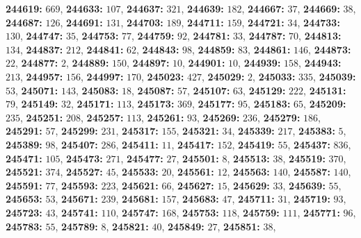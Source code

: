 \textsf{\bfseries 244619:} $669$, \textsf{\bfseries 244633:} $107$, \textsf{\bfseries 244637:} $321$, \textsf{\bfseries 244639:} $182$, \textsf{\bfseries 244667:} $37$, \textsf{\bfseries 244669:} $38$, \textsf{\bfseries 244687:} $126$, \textsf{\bfseries 244691:} $131$, \textsf{\bfseries 244703:} $189$, \textsf{\bfseries 244711:} $159$, \textsf{\bfseries 244721:} $34$, \textsf{\bfseries 244733:} $130$, \textsf{\bfseries 244747:} $35$, \textsf{\bfseries 244753:} $77$, \textsf{\bfseries 244759:} $92$, \textsf{\bfseries 244781:} $33$, \textsf{\bfseries 244787:} $70$, \textsf{\bfseries 244813:} $134$, \textsf{\bfseries 244837:} $212$, \textsf{\bfseries 244841:} $62$, \textsf{\bfseries 244843:} $98$, \textsf{\bfseries 244859:} $83$, \textsf{\bfseries 244861:} $146$, \textsf{\bfseries 244873:} $22$, \textsf{\bfseries 244877:} $2$, \textsf{\bfseries 244889:} $150$, \textsf{\bfseries 244897:} $10$, \textsf{\bfseries 244901:} $10$, \textsf{\bfseries 244939:} $158$, \textsf{\bfseries 244943:} $213$, \textsf{\bfseries 244957:} $156$, \textsf{\bfseries 244997:} $170$, \textsf{\bfseries 245023:} $427$, \textsf{\bfseries 245029:} $2$, \textsf{\bfseries 245033:} $335$, \textsf{\bfseries 245039:} $53$, \textsf{\bfseries 245071:} $143$, \textsf{\bfseries 245083:} $18$, \textsf{\bfseries 245087:} $57$, \textsf{\bfseries 245107:} $63$, \textsf{\bfseries 245129:} $222$, \textsf{\bfseries 245131:} $79$, \textsf{\bfseries 245149:} $32$, \textsf{\bfseries 245171:} $113$, \textsf{\bfseries 245173:} $369$, \textsf{\bfseries 245177:} $95$, \textsf{\bfseries 245183:} $65$, \textsf{\bfseries 245209:} $235$, \textsf{\bfseries 245251:} $208$, \textsf{\bfseries 245257:} $113$, \textsf{\bfseries 245261:} $93$, \textsf{\bfseries 245269:} $236$, \textsf{\bfseries 245279:} $186$, \textsf{\bfseries 245291:} $57$, \textsf{\bfseries 245299:} $231$, \textsf{\bfseries 245317:} $155$, \textsf{\bfseries 245321:} $34$, \textsf{\bfseries 245339:} $217$, \textsf{\bfseries 245383:} $5$, \textsf{\bfseries 245389:} $98$, \textsf{\bfseries 245407:} $286$, \textsf{\bfseries 245411:} $11$, \textsf{\bfseries 245417:} $152$, \textsf{\bfseries 245419:} $55$, \textsf{\bfseries 245437:} $836$, \textsf{\bfseries 245471:} $105$, \textsf{\bfseries 245473:} $271$, \textsf{\bfseries 245477:} $27$, \textsf{\bfseries 245501:} $8$, \textsf{\bfseries 245513:} $38$, \textsf{\bfseries 245519:} $370$, \textsf{\bfseries 245521:} $374$, \textsf{\bfseries 245527:} $45$, \textsf{\bfseries 245533:} $20$, \textsf{\bfseries 245561:} $12$, \textsf{\bfseries 245563:} $140$, \textsf{\bfseries 245587:} $140$, \textsf{\bfseries 245591:} $77$, \textsf{\bfseries 245593:} $223$, \textsf{\bfseries 245621:} $66$, \textsf{\bfseries 245627:} $15$, \textsf{\bfseries 245629:} $33$, \textsf{\bfseries 245639:} $55$, \textsf{\bfseries 245653:} $53$, \textsf{\bfseries 245671:} $239$, \textsf{\bfseries 245681:} $157$, \textsf{\bfseries 245683:} $47$, \textsf{\bfseries 245711:} $31$, \textsf{\bfseries 245719:} $93$, \textsf{\bfseries 245723:} $43$, \textsf{\bfseries 245741:} $110$, \textsf{\bfseries 245747:} $168$, \textsf{\bfseries 245753:} $118$, \textsf{\bfseries 245759:} $111$, \textsf{\bfseries 245771:} $96$, \textsf{\bfseries 245783:} $55$, \textsf{\bfseries 245789:} $8$, \textsf{\bfseries 245821:} $40$, \textsf{\bfseries 245849:} $27$, \textsf{\bfseries 245851:} $38$, 
